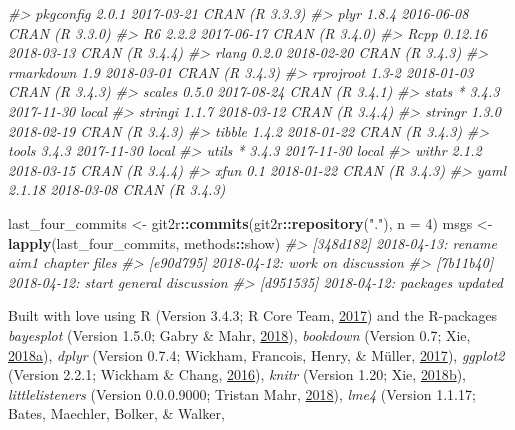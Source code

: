 \documentclass [11pt, proquest] {uwthesis}[2015/03/03]
\newenvironment{Shaded}{}{}
\newcommand{\KeywordTok}[1]{\textcolor[rgb]{0.00,0.44,0.13}{\textbf{{#1}}}}
\newcommand{\DataTypeTok}[1]{\textcolor[rgb]{0.56,0.13,0.00}{{#1}}}
\newcommand{\DecValTok}[1]{\textcolor[rgb]{0.25,0.63,0.44}{{#1}}}
\newcommand{\StringTok}[1]{\textcolor[rgb]{0.25,0.44,0.63}{{#1}}}
\newcommand{\CommentTok}[1]{\textcolor[rgb]{0.38,0.63,0.69}{\textit{{#1}}}}
\newcommand{\NormalTok}[1]{{#1}}
\newcommand{\OperatorTok}[1]{\textcolor[rgb]{0.00,0.44,0.13}{\textbf{{#1}}}}
\begin{document}
\begin{Shaded}
\begin{Highlighting}[]
\CommentTok{#>  pkgconfig    2.0.1   2017-03-21 CRAN (R 3.3.3)}
\CommentTok{#>  plyr         1.8.4   2016-06-08 CRAN (R 3.3.0)}
\CommentTok{#>  R6           2.2.2   2017-06-17 CRAN (R 3.4.0)}
\CommentTok{#>  Rcpp         0.12.16 2018-03-13 CRAN (R 3.4.4)}
\CommentTok{#>  rlang        0.2.0   2018-02-20 CRAN (R 3.4.3)}
\CommentTok{#>  rmarkdown    1.9     2018-03-01 CRAN (R 3.4.3)}
\CommentTok{#>  rprojroot    1.3-2   2018-01-03 CRAN (R 3.4.3)}
\CommentTok{#>  scales       0.5.0   2017-08-24 CRAN (R 3.4.1)}
\CommentTok{#>  stats      * 3.4.3   2017-11-30 local         }
\CommentTok{#>  stringi      1.1.7   2018-03-12 CRAN (R 3.4.4)}
\CommentTok{#>  stringr      1.3.0   2018-02-19 CRAN (R 3.4.3)}
\CommentTok{#>  tibble       1.4.2   2018-01-22 CRAN (R 3.4.3)}
\CommentTok{#>  tools        3.4.3   2017-11-30 local         }
\CommentTok{#>  utils      * 3.4.3   2017-11-30 local         }
\CommentTok{#>  withr        2.1.2   2018-03-15 CRAN (R 3.4.4)}
\CommentTok{#>  xfun         0.1     2018-01-22 CRAN (R 3.4.3)}
\CommentTok{#>  yaml         2.1.18  2018-03-08 CRAN (R 3.4.3)}

\NormalTok{last_four_commits <-}\StringTok{ }\NormalTok{git2r}\OperatorTok{::}\KeywordTok{commits}\NormalTok{(git2r}\OperatorTok{::}\KeywordTok{repository}\NormalTok{(}\StringTok{"."}\NormalTok{), }\DataTypeTok{n =} \DecValTok{4}\NormalTok{)}
\NormalTok{msgs <-}\StringTok{ }\KeywordTok{lapply}\NormalTok{(last_four_commits, methods}\OperatorTok{::}\NormalTok{show)}
\CommentTok{#> [348d182] 2018-04-13: rename aim1 chapter files}
\CommentTok{#> [e90d795] 2018-04-12: work on discussion}
\CommentTok{#> [7b11b40] 2018-04-12: start general discussion}
\CommentTok{#> [d951535] 2018-04-12: packages updated}
\end{Highlighting}
\end{Shaded}
Built with love using R (Version 3.4.3; R Core Team,
\protect\hyperlink{ref-R-base}{2017}) and the R-packages
\emph{bayesplot} (Version 1.5.0; Gabry \& Mahr,
\protect\hyperlink{ref-R-bayesplot}{2018}), \emph{bookdown} (Version
0.7; Xie,
\protect\hyperlink{ref-R-bookdown}{2018}\protect\hyperlink{ref-R-bookdown}{a}),
\emph{dplyr} (Version 0.7.4; Wickham, Francois, Henry, \& Müller,
\protect\hyperlink{ref-R-dplyr}{2017}), \emph{ggplot2} (Version 2.2.1;
Wickham \& Chang, \protect\hyperlink{ref-R-ggplot2}{2016}), \emph{knitr}
(Version 1.20; Xie,
\protect\hyperlink{ref-R-knitr}{2018}\protect\hyperlink{ref-R-knitr}{b}),
\emph{littlelisteners} (Version 0.0.0.9000; Tristan Mahr,
\protect\hyperlink{ref-R-littlelisteners}{2018}), \emph{lme4} (Version
1.1.17; Bates, Maechler, Bolker, \& Walker,
\end{document}
